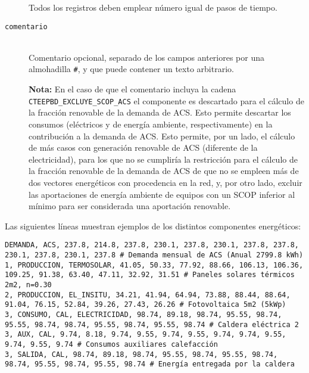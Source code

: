 \documentclass[10pt,notitlepage,oneside,a4paper]{article}
\begin{document}
\begin{description}
          Todos los registros deben emplear número igual de pasos de tiempo.

    \item [\texttt{comentario}] \hfill \\
          Comentario opcional, separado de los campos anteriores por una almohadilla \texttt{\#}, y que puede contener un texto arbitrario.
          \begin{myquote}\small
              \textbf{Nota:} En el caso de que el comentario incluya la cadena \texttt{CTEEPBD\_EXCLUYE\_SCOP\_ACS} el componente es descartado para el cálculo de la fracción renovable de la demanda de ACS. Esto permite descartar los consumos (eléctricos y de energía ambiente, respectivamente) en la contribución a la demanda de ACS. Esto permite, por un lado, el cálculo de más casos con generación renovable de ACS (diferente de la electricidad), para los que no se cumpliría la restricción para el cálculo de la fracción renovable de la demanda de ACS de que no se empleen más de dos vectores energéticos con procedencia en la red, y, por otro lado, excluir las aportaciones de energía ambiente de equipos con un SCOP inferior al mínimo para ser considerada una aportación renovable.
          \end{myquote}
\end{description}

Las siguientes líneas muestran ejemplos de los distintos componentes energéticos:

\begin{lstlisting}
DEMANDA, ACS, 237.8, 214.8, 237.8, 230.1, 237.8, 230.1, 237.8, 237.8, 230.1, 237.8, 230.1, 237.8 # Demanda mensual de ACS (Anual 2799.8 kWh)
1, PRODUCCION, TERMOSOLAR, 41.05, 50.33, 77.92, 88.66, 106.13, 106.36, 109.25, 91.38, 63.40, 47.11, 32.92, 31.51 # Paneles solares térmicos 2m2, n=0.30
2, PRODUCCION, EL_INSITU, 34.21, 41.94, 64.94, 73.88, 88.44, 88.64, 91.04, 76.15, 52.84, 39.26, 27.43, 26.26 # Fotovoltaica 5m2 (5kWp)
3, CONSUMO, CAL, ELECTRICIDAD, 98.74, 89.18, 98.74, 95.55, 98.74, 95.55, 98.74, 98.74, 95.55, 98.74, 95.55, 98.74 # Caldera eléctrica 2
3, AUX, CAL, 9.74, 8.18, 9.74, 9.55, 9.74, 9.55, 9.74, 9.74, 9.55, 9.74, 9.55, 9.74 # Consumos auxiliares calefacción
3, SALIDA, CAL, 98.74, 89.18, 98.74, 95.55, 98.74, 95.55, 98.74, 98.74, 95.55, 98.74, 95.55, 98.74 # Energía entregada por la caldera
\end{lstlisting}
\end{document}
